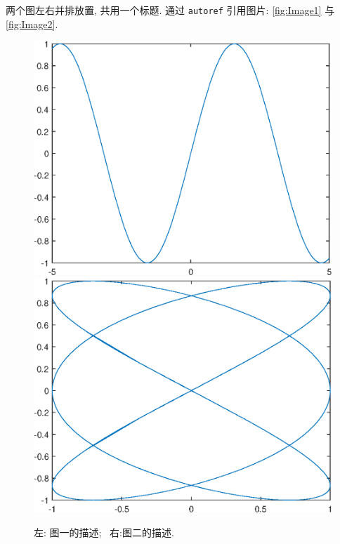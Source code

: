 \documentclass[UTF8,openany,twoside,12pt]{book}
\theoremstyle{plain}
\begin{document}
两个图左右并排放置, 共用一个标题. 通过 \verb|autoref| 引用图片: \autoref{fig:Image1} 与 \autoref{fig:Image2}.
\begin{figure}[htp!]
\centering
  \includegraphics[width=0.45\linewidth]{image1.eps}
  \hfill
  \includegraphics[width=0.45\linewidth]{image2.eps}
  \caption{左: 图一的描述;~ 右:图二的描述.}
  \label{fig:image}
\end{figure}
\end{document}
